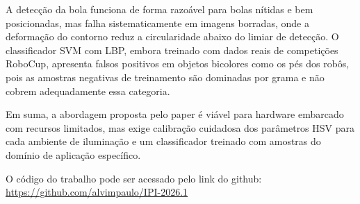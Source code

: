 \documentclass[journal]{IEEEtran}
\begin{document}
A detecção da bola funciona de forma razoável para bolas nítidas e bem posicionadas, mas falha sistematicamente em imagens borradas, onde a deformação do contorno reduz a circularidade abaixo do limiar de detecção. O classificador SVM com LBP, embora treinado com dados reais de competições RoboCup, apresenta falsos positivos em objetos bicolores como os pés dos robôs, pois as amostras negativas de treinamento são dominadas por grama e não cobrem adequadamente essa categoria.

Em suma, a abordagem proposta pelo paper é viável para hardware embarcado com recursos limitados, mas exige calibração cuidadosa dos parâmetros HSV para cada ambiente de iluminação e um classificador treinado com amostras do domínio de aplicação específico.









\appendix
O código do trabalho pode ser acessado pelo link do github: \url{https://github.com/alvimpaulo/IPI-2026.1}





\end{document}
